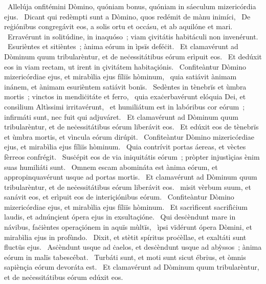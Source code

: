 {~Allelúja}
{%
onfitémini Dòmino, quóniam bonus, quóniam in sáeculum mizericórdia ejus. 
~Dicant qui redèmpti sunt a Dòmino, quos redémit de mànu inimíci, 
~De reġiónibus congregávit eos, a solis ortu et occásu, et ab aquilóne et mari. 
~Erravérunt in solitúdine, in inaquóso~; viam çivitátis habitáculi non invenérunt. 
~Esurièntes et sitièntes~; ànima eórum in ìpsïs deféċit. 
~Et clamavérunt ad Dòminum quum tribularèntur, et de neċessitátibus eórum erìpuit eos. 
~Et dedúxit eos in viam rectam, ut irent in çivitátem habitaçiónis. 
~Confiteàntur Dòmino mizericórdiae ejus, et mirabìlia ejus fíliïs hòminum, 
~quia satiávit ànimam inánem, et ànimam esurièntem satiávit bonïs. 
~Sedèntes in tènebrïs et ùmbra mortis~; vinctos in mendiċitáte et ferro, 
~quia exaċerbavérunt elóquia Dei, et consìlium Altìssimi irritavérunt, 
~et humiliátum est in labóribus cor eórum~; infirmáti sunt, nec fuit qui adjuváret. 
~Et clamavérunt ad Dòminum quum tribularèntur, et de neċessitátibus eórum liberávit eos. 
~Et edúxit eos de tènebrïs et ùmbra mortis, et vìncula eórum dirúpit. 
~Confiteàntur Dòmino mizericórdiae ejus, et mirabìlia ejus fíliïs hòminum. 
~Quia contrívit portas áereas, et vèctes fèrreos confrégit. 
~Susċépit eos de via iniquitátis eórum~; pròpter injustìçias ènim suas humiliáti sunt. 
~Omnem escam abomináta est ànima eórum, et appropinquavérunt usque ad portas mortis. 
~Et clamavérunt ad Dòminum quum tribularèntur, et de neċessitátibus eórum liberávit eos. 
~misit vèrbum suum, et sanávit eos, et erìpuit eos de interiçiónibus eórum. 
~Confiteàntur Dòmino mizericórdiae ejus, et mirabìlia ejus fíliïs hòminum. 
~Et sacrìficent sacrifìċium laudis, et adnúnçient ópera ejus in exsultaçióne. 
~Qui desċèndunt mare in návibus, faċièntes operaçiónem in aquïs mùltïs, 
~ìpsi vïdérunt ópera Dòmini, et mirabìlia ejus in profùndo. 
~Dixit, et stètit spíritus proċèllae, et exaltáti sunt fluctüs ejus. 
~Asċèndunt usque ad ċaelos, et desċèndunt usque ad abỳssos~; ànima eórum in malïs tabescébat. 
~Turbáti sunt, et moti sunt sicut ébrius, et òmnis sapiènçia eórum devoráta est. 
~Et clamavérunt ad Dòminum quum tribularèntur, et de neċessitátibus eórum edúxit eos. 
}
